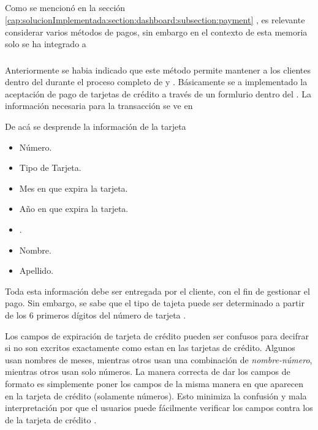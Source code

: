 \subsection{\paymentsCOM}\label{chapter:solucionimplementada:section:payment}
	
	Como se mencionó en la sección \ref{cap:solucionImplementada:section:dashboard:subsection:payment} , es relevante considerar varios métodos de pagos, sin embargo en el contexto de esta memoria solo se ha integrado a \PPPaymentProNAME


	\subsubsection{\PPPaymentProNAME}
		Anteriormente se habia indicado que este método permite mantener a los clientes dentro del \websiteINT durante el proceso completo de \paymentsCOM y \checkoutCOM. Básicamente se a implementado la aceptación de pago de tarjetas de crédito a través de un formlurio dentro del \websiteINT. La información necesaria para la transacción se ve en 

		

		De acá se desprende la información de la tarjeta

		\begin{itemize}
			\item Número.
			\item Tipo de Tarjeta.
			\item Mes en que expira la tarjeta.
			\item Año en que expira la tarjeta.
			\item \cvvTWOCOM.
			\item Nombre.
			\item Apellido.
		\end{itemize} 

		Toda esta información debe ser entregada por el cliente, con el fin de gestionar el pago. Sin embargo, se sabe que el tipo de tajeta puede ser determinado a partir de los 6 primeros dígitos del número de tarjeta \cite{online_investopedia_meaning_IIN}. 

		Los campos de expiración de tarjeta de crédito pueden ser confusos para decifrar si no son excritos exactamente como estan en las tarjetas de crédito. Algunos \websitesINT usan nombres de meses, mientras otros usan una combinación de \textit{nombre-número}, mientras otros usan solo números. La manera correcta de dar los campos de formato es simplemente poner los campos de la misma manera en que aparecen en la tarjeta de crédito (solamente números). Esto minimiza la confusión y mala interpretación por que el usuarios puede fácilmente verificar  los campos contra los de la tarjeta de crédito \cite{online_official_smashingmagazine_fundamental_guidelines_checkout_design}.


